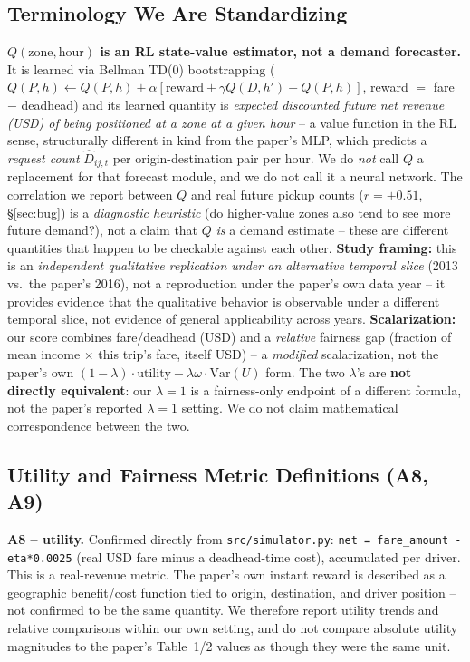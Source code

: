 \documentclass[10pt,twocolumn,a4paper]{article}
\begin{document}
\subsection{Terminology We Are Standardizing}
\label{sec:terminology}
\textbf{$Q(\text{zone},\text{hour})$ is an RL state-value estimator, not a
demand forecaster.} It is learned via Bellman TD(0) bootstrapping
($Q(P,h)\leftarrow Q(P,h)+\alpha[\text{reward}+\gamma Q(D,h')-Q(P,h)]$,
reward $=$ fare $-$ deadhead) and its learned quantity is \emph{expected
discounted future net revenue (USD) of being positioned at a zone at a given
hour} -- a value function in the RL sense, structurally different in kind
from the paper's MLP, which predicts a \emph{request count}
$\hat D_{ij,t}$ per origin-destination pair per hour. We do \emph{not} call
$Q$ a replacement for that forecast module, and we do not call it a neural
network. The correlation we report between $Q$ and real future pickup
counts ($r=+0.51$, \S\ref{sec:bug}) is a \emph{diagnostic heuristic} (do
higher-value zones also tend to see more future demand?), not a claim that
$Q$ \emph{is} a demand estimate -- these are different quantities that
happen to be checkable against each other.
\textbf{Study framing:} this is an \emph{independent qualitative
replication under an alternative temporal slice} (2013 vs.\ the paper's
2016), not a reproduction under the paper's own data year -- it provides
evidence that the qualitative behavior is observable under a different
temporal slice, not evidence of general applicability across years.
\textbf{Scalarization:} our score combines fare/deadhead (USD) and a
\emph{relative} fairness gap (fraction of mean income $\times$ this trip's
fare, itself USD) -- a \emph{modified} scalarization, not the paper's own
$(1-\lambda)\cdot\text{utility}-\lambda\omega\cdot\text{Var}(U)$ form. The
two $\lambda$'s are \textbf{not directly equivalent}: our $\lambda=1$ is a
fairness-only endpoint of a different formula, not the paper's reported
$\lambda=1$ setting. We do not claim mathematical correspondence between
the two.

\subsection{Utility and Fairness Metric Definitions (A8, A9)}
\textbf{A8 -- utility.} Confirmed directly from \texttt{src/simulator.py}:
\texttt{net = fare\_amount - eta*0.0025} (real USD fare minus a deadhead-time
cost), accumulated per driver. This is a real-revenue metric. The paper's
own instant reward is described as a geographic benefit/cost function tied
to origin, destination, and driver position -- not confirmed to be the same
quantity. We therefore report utility trends and relative comparisons within
our own setting, and do not compare absolute utility magnitudes to the
paper's Table~1/2 values as though they were the same unit.
\end{document}
